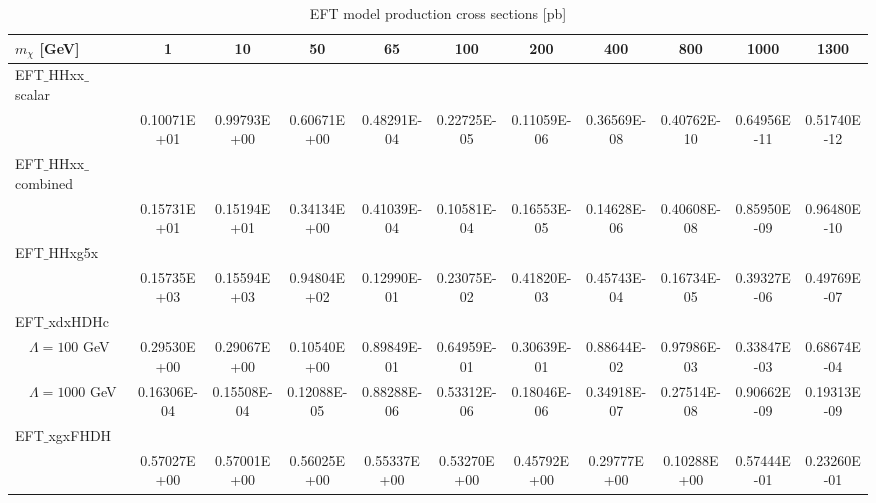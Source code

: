 \begin{table}
\begin{center}
\begin{tabular}{l | c | c | c | c | c | c | c | c | c | c}
\hline 
$m_\chi$ [GeV] & 1 & 10 & 50 & 65 & 100 & 200 & 400 & 800 & 1000 & 1300 \\
\hline
EFT$\_$HHxx$\_$scalar & & & & & & & & & & \\
 & 0.10071E+01 & 0.99793E+00 & 0.60671E+00 & 0.48291E-04 & 0.22725E-05 & 0.11059E-06 & 0.36569E-08 & 0.40762E-10 & 0.64956E-11 & 0.51740E-12 \\
EFT$\_$HHxx$\_$combined & & & & & & & & & & \\
 & 0.15731E+01 & 0.15194E+01 & 0.34134E+00 & 0.41039E-04 & 0.10581E-04 & 0.16553E-05 & 0.14628E-06 & 0.40608E-08 & 0.85950E-09 & 0.96480E-10 \\
EFT$\_$HHxg5x & & & & & & & & & & \\
 & 0.15735E+03 & 0.15594E+03 & 0.94804E+02 & 0.12990E-01 & 0.23075E-02 & 0.41820E-03 & 0.45743E-04 & 0.16734E-05 & 0.39327E-06 & 0.49769E-07 \\
EFT$\_$xdxHDHc & & & & & & & & & & \\
$\quad \Lambda = 100$ GeV & 0.29530E+00 & 0.29067E+00 & 0.10540E+00 & 0.89849E-01 & 0.64959E-01 & 0.30639E-01 & 0.88644E-02 & 0.97986E-03 & 0.33847E-03 & 0.68674E-04 \\
$\quad \Lambda = 1000$ GeV & 0.16306E-04 & 0.15508E-04 & 0.12088E-05 & 0.88288E-06 & 0.53312E-06 & 0.18046E-06 & 0.34918E-07 & 0.27514E-08 & 0.90662E-09 & 0.19313E-09 \\
EFT$\_$xgxFHDH & & & & & & & & & & \\
 & 0.57027E+00 & 0.57001E+00 & 0.56025E+00 & 0.55337E+00 & 0.53270E+00 & 0.45792E+00 & 0.29777E+00 & 0.10288E+00 & 0.57444E-01 & 0.23260E-01 \\
\hline
\end{tabular}
\caption{EFT model production cross sections [pb]\label{tab:eftxsecs}}
\end{center}
\end{table}

